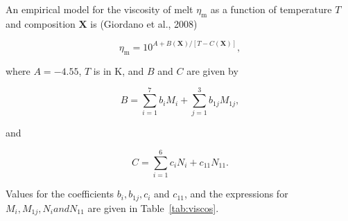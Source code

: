 \documentclass[]{book}
\theoremstyle{definition}
\begin{document}
\begin{enumerate}
  An empirical model for the viscosity of melt $\eta_{\text{m}}$ as a function of temperature $T$ and composition $\mathbf{X}$ is (Giordano et al., 2008)
  
  \begin{equation}
    \label{equ:Giordano}
    \eta_{\text{m}} = 10 ^{A + B(\mathbf{X})/[T - C(\mathbf{X})]},
  \end{equation}

  where $A = -4.55$, $T$ is in K, and $B$ and $C$ are given by

  \begin{equation}
    \label{equ:Giordano_B}
    B = \sum_{i = 1}^{7} b_{i} M_{i} + \sum_{j = 1}^{3} b_{1j} M_{1j},
  \end{equation}

  and
  
  \begin{equation}
    \label{equ:Giordano_C}
    C = \sum_{i = 1}^{6} c_{i} N_{i} + c_{11} N_{11}.
  \end{equation}

  Values for the coefficients $b_{i}, b_{1j}, c_{i}$ and $c_{11}$, and the expressions for $M_{i}, M_{1j}, N_{i} and N_{11}$ are given in Table~\ref{tab:viscos}.


\end{enumerate}
\end{document}
